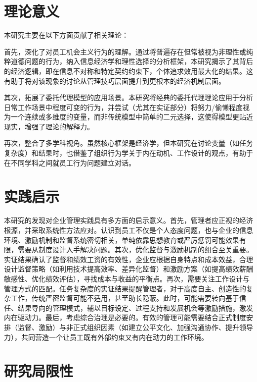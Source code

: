 \section{理论意义}

本研究主要在以下方面贡献了相关理论：

首先，{深化了对员工机会主义行为的理解}。通过将普遍存在但常被视为非理性或纯粹道德问题的行为，纳入信息经济学和理性选择的分析框架，本研究揭示了其背后的经济逻辑，即在信息不对称和特定契约约束下，个体追求效用最大化的结果。这有助于将对该现象的讨论从管理技巧层面提升到更根本的经济机制层面。

其次，{拓展了委托代理模型的应用场景}。本研究将经典的委托代理理论应用于分析日常工作场景中程度可变的行为，并尝试（尤其在实证部分）将努力/偷懒程度视为一个连续或多维度的变量，而非传统模型中简单的二元选择，这使得模型更贴近现实，增强了理论的解释力。

再次，{整合了多学科视角}。虽然核心框架是经济学，但本研究在讨论变量（如任务复杂度）和结果时，也借鉴了组织行为学关于内在动机、工作设计的观点，有助于在不同学科之间就员工行为问题建立对话。

\section{实践启示}

本研究的发现对企业管理实践具有多方面的启示意义。首先，管理者应正视的经济根源，并采取系统性方法应对。认识到员工不仅是个人态度问题，也与企业的信息环境、激励机制和监督系统密切相关，单纯依靠思想教育或严厉惩罚可能效果有限，需要从制度设计入手解决问题。其次，优化监督与激励机制的组合至关重要。实证结果确认了监督和绩效工资的有效性，企业应根据自身特点和成本效益，合理设计监督策略（如利用技术提高效率、差异化监督）和激励方案（如提高绩效薪酬敏感性、优化绩效评估），寻找成本与收益的平衡点。再次，需要关注工作设计与管理方式的匹配。任务复杂度的实证结果提醒管理者，对于高度自主、创造性的复杂工作，传统严密监督可能不适用，甚至助长隐蔽。此时，可能需要转向基于信任、结果导向的管理模式，辅以目标设定、过程支持和发展机会等激励措施，激发内在驱动力。最后，考虑综合治理是必要的。有效的管理可能需要结合正式制度安排（监督、激励）与非正式组织因素（如建立公平文化、加强沟通协作、提升领导力），共同营造一个让员工既有外部约束又有内在动力的工作环境。

\section{研究局限性}

